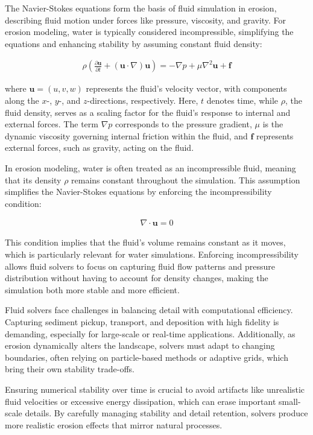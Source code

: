 The Navier-Stokes equations form the basis of fluid simulation in erosion, describing fluid motion under forces like pressure, viscosity, and gravity. For erosion modeling, water is typically considered incompressible, simplifying the equations and enhancing stability by assuming constant fluid density:

\begin{align}
    \rho \left( \frac{\partial \mathbf{u}}{\partial t} + (\mathbf{u} \cdot \nabla) \mathbf{u} \right) = -\nabla p + \mu \nabla^2 \mathbf{u} + \mathbf{f}
\end{align}


where $\mathbf{u} = (u, v, w)$ represents the fluid's velocity vector, with components along the $x$-, $y$-, and $z$-directions, respectively. Here, $t$ denotes time, while $\rho$, the fluid density, serves as a scaling factor for the fluid's response to internal and external forces. The term $\nabla p$ corresponds to the pressure gradient, $\mu$ is the dynamic viscosity governing internal friction within the fluid, and $\mathbf{f}$ represents external forces, such as gravity, acting on the fluid.

In erosion modeling, water is often treated as an incompressible fluid, meaning that its density $\rho$ remains constant throughout the simulation. This assumption simplifies the Navier-Stokes equations by enforcing the incompressibility condition:

\begin{align}
    \nabla \cdot \mathbf{u} = 0
\end{align}

This condition implies that the fluid's volume remains constant as it moves, which is particularly relevant for water simulations. Enforcing incompressibility allows fluid solvers to focus on capturing fluid flow patterns and pressure distribution without having to account for density changes, making the simulation both more stable and more efficient.

Fluid solvers face challenges in balancing detail with computational efficiency. Capturing sediment pickup, transport, and deposition with high fidelity is demanding, especially for large-scale or real-time applications. Additionally, as erosion dynamically alters the landscape, solvers must adapt to changing boundaries, often relying on particle-based methods or adaptive grids, which bring their own stability trade-offs.

Ensuring numerical stability over time is crucial to avoid artifacts like unrealistic fluid velocities or excessive energy dissipation, which can erase important small-scale details. By carefully managing stability and detail retention, solvers produce more realistic erosion effects that mirror natural processes.


